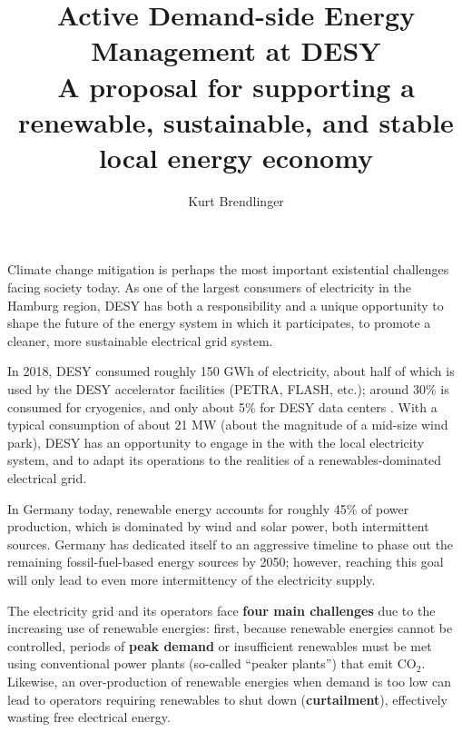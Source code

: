 \documentclass[11pt]{article}
\title{Active Demand-side Energy Management at DESY\\ 
       {\large A proposal for supporting a renewable, sustainable, and stable local energy economy}}
\author{Kurt Brendlinger}
\date{}
\begin{document}
\maketitle
\thispagestyle{empty}

Climate change mitigation is perhaps the most important existential challenges facing society today.
As one of the largest consumers of electricity in the Hamburg region, DESY has both a
responsibility and a unique opportunity
to shape the future of the energy system in which it participates, to promote a cleaner, more
sustainable electrical grid system.

In 2018, DESY consumed roughly 150 GWh of electricity,
about half of which is used by the DESY accelerator facilities
(PETRA, FLASH, etc.); around 30\% is consumed for cryogenics,
and only about 5\% for DESY data centers
\cite{jensen}.
With a typical consumption of about 21 MW (about the magnitude of a mid-size wind park),
DESY has an opportunity to engage in the with the local electricity system, and to adapt its
operations to the realities of a renewables-dominated electrical grid. 

In Germany today, renewable
energy accounts for roughly 45\% of power production, which is dominated by wind and solar power,
both intermittent sources. Germany has dedicated itself to an aggressive timeline to phase out the
remaining fossil-fuel-based energy sources by 2050; however, reaching this goal will only lead to
even more intermittency of the electricity supply.


The electricity grid and its operators face \textbf{four main challenges}
due to the increasing use of renewable energies:
first, because renewable energies cannot be controlled, periods of \textbf{peak demand}
or insufficient renewables must be met using conventional power plants (so-called ``peaker plants'')
that emit CO$_{2}$. Likewise, an over-production of renewable energies when demand is too low
can lead to operators requiring renewables to shut down (\textbf{curtailment}), effectively
wasting free electrical energy.
\end{document}
